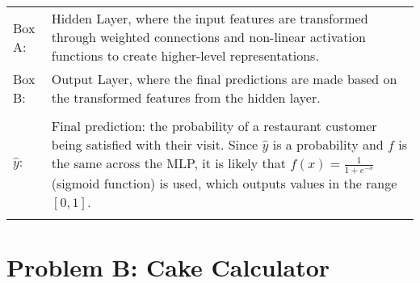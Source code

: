 \documentclass{solutionclass} %
\begin{document}
\begin{solution}
\begin{tabular}{p{3cm} p{11cm}}
            \large{Box A:} & Hidden Layer, where the input features are transformed through weighted connections and non-linear activation functions to create higher-level representations.
            \vspace{0.7cm} \\
            
            \large{Box B:} & Output Layer, where the final predictions are made based on the transformed features from the hidden layer. \\
            \vspace{0.7cm} \\

            \Large{$\hat{y}:$} & Final prediction: the probability of a restaurant customer being satisfied with their visit. Since $\hat{y}$ is a probability and $f$ is the same across the MLP, it is likely that $f(x)=\frac{1}{1+e^{-x}}$ (sigmoid function) is used, which outputs values in the range $[0, 1]$. \\ \\

        \end{tabular}
    \end{solution}

    \divider

    \section{Problem B: Cake Calculator}
\end{document}
